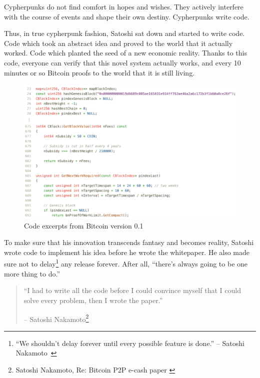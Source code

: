 Cypherpunks do not find comfort in hopes and wishes. They actively
interfere with the course of events and shape their own destiny.
Cypherpunks write code.

Thus, in true cypherpunk fashion, Satoshi sat down and started to write
code. Code which took an abstract idea and proved to the world that it
actually worked. Code which planted the seed of a new economic reality.
Thanks to this code, everyone can verify that this novel system actually
works, and every 10 minutes or so Bitcoin proofs to the world that it is
still living.

\begin{figure}
  \includegraphics{assets/images/bitcoin-code-white.png}
  \caption{Code excerpts from Bitcoin version 0.1}
  \label{fig:bitcoin-code-white}
\end{figure}

To make sure that his innovation transcends fantasy and becomes reality, Satoshi
wrote code to implement his idea before he wrote the whitepaper. He also made
sure not to delay\footnote{\enquote{We shouldn't delay forever until every possible
feature is done.} -- Satoshi Nakamoto~\cite{satoshi-delay}} any release forever.
After all, \enquote{there's always going to be one more thing to do.}

\begin{quotation}\begin{samepage}
\enquote{I had to write all the code before I could convince myself that I
could solve every problem, then I wrote the paper.}
\begin{flushright} -- Satoshi Nakamoto\footnote{Satoshi Nakamoto, Re: Bitcoin P2P e-cash paper \cite{satoshi-mail-code-first}}
\end{flushright}\end{samepage}\end{quotation}

